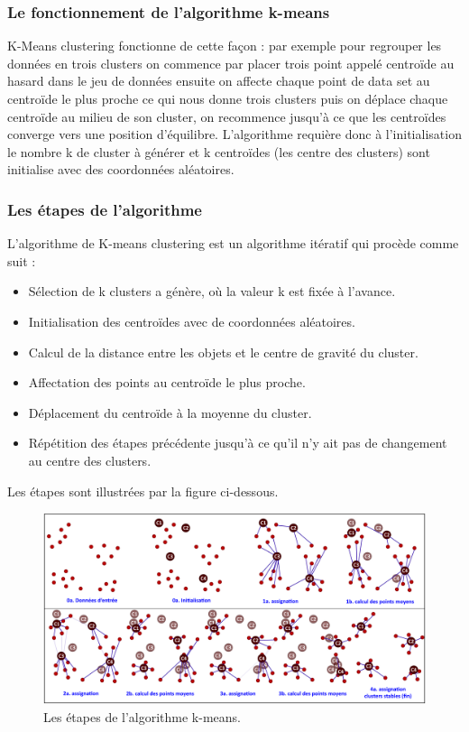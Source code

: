 \subsubsection{Le fonctionnement de l’algorithme k-means}
K-Means clustering fonctionne de cette façon : par exemple pour regrouper les données en trois clusters on commence par placer trois point appelé centroïde au hasard dans le jeu de données ensuite on affecte chaque point de data set au centroïde le plus proche ce qui nous donne trois clusters puis on déplace chaque centroïde au milieu de son cluster, on recommence jusqu’à ce que les centroïdes converge vers une position d’équilibre. L’algorithme requière donc à l’initialisation le nombre k de cluster à générer et k centroïdes (les centre des clusters) sont initialise avec des coordonnées aléatoires.

\subsubsection{Les étapes de l’algorithme}
L’algorithme de K-means clustering est un algorithme itératif qui procède comme suit :

\begin{itemize}
	\item	Sélection de k clusters a génère, où la valeur k est fixée à l'avance.
	\item	Initialisation des centroïdes avec de coordonnées aléatoires.
	\item	Calcul de la distance entre les objets et le centre de gravité du cluster.
	\item	Affectation des points au centroïde le plus proche.
	\item	Déplacement du centroïde à la moyenne du cluster.
	\item	Répétition des étapes précédente jusqu'à ce qu'il n'y ait pas de changement au centre des clusters.
\end{itemize}

Les étapes sont illustrées par la figure ci-dessous.

\begin{figure}[H]
	\begin{center}
		\includegraphics[width=\textwidth]{images/chapitre6/kmeans_steps.png}
	\end{center}
	\caption{Les étapes de l'algorithme k-means.}
	\label{kmeans_steps}
\end{figure}

